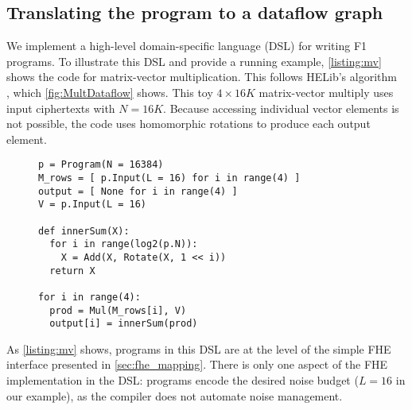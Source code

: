 \subsection{Translating the program to a dataflow graph}
\label{sec:programming}

We implement a high-level domain-specific language (DSL) for writing F1 programs.
%
To illustrate this DSL and provide a running example,
\autoref{listing:mv} shows the code for matrix-vector multiplication.
This follows HELib's algorithm~\cite{halevi:crypto14:algorithms}
, which \autoref{fig:MultDataflow} shows.
This toy $4 \times 16K$ matrix-vector multiply uses input ciphertexts with $N=16K$.
Because accessing individual vector elements is not possible, the code uses homomorphic rotations %
to produce each output element.

\figMultDataflow

\begin{figure}
\begin{center}
  \begin{lstlisting}[caption={$(4 \times 16K)$ matrix-vector multiply in F1's DSL.}, mathescape=true, style=custompython, label=listing:mv]
p = Program(N = 16384)
M_rows = [ p.Input(L = 16) for i in range(4) ]
output = [ None for i in range(4) ]
V = p.Input(L = 16)

def innerSum(X):
  for i in range(log2(p.N)):
    X = Add(X, Rotate(X, 1 << i))
  return X

for i in range(4):
  prod = Mul(M_rows[i], V)
  output[i] = innerSum(prod)
  \end{lstlisting}
\end{center}
\vspace{0.15cm}
\end{figure}

As \autoref{listing:mv} shows, programs in this DSL are at the level
of the simple FHE interface presented in \autoref{sec:fhe_mapping}.
There is only one aspect of the FHE implementation in the DSL:
programs encode the desired noise budget ($L=16$ in our example),
as the compiler does not automate noise management.

